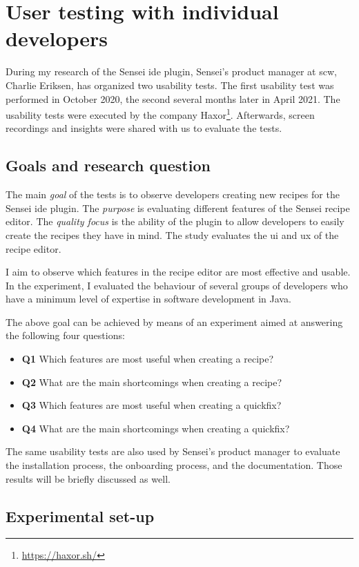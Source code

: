 \section{User testing with individual developers}
\label{sec:user-testing}
During my research of the Sensei \gls{ide} plugin, Sensei's product manager at \gls{scw}, Charlie Eriksen, has organized two usability tests.
The first usability test was performed in October 2020, the second several months later in April 2021.
The usability tests were executed by the company Haxor\footnote{\url{https://haxor.sh/}}.
Afterwards, screen recordings and insights were shared with us to evaluate the tests.

\subsection{Goals and research question}
The main \textit{goal} of the tests is to observe developers creating new recipes for the Sensei \gls{ide} plugin.
The \textit{purpose} is evaluating different features of the Sensei recipe editor.
The \textit{quality focus} is the ability of the plugin to allow developers to easily create the recipes they have in mind.
The study evaluates the \gls{ui} and \gls{ux} of the recipe editor.

I aim to observe which features in the recipe editor are most effective and usable.
In the experiment, I evaluated the behaviour of several groups of developers who have a minimum level of expertise in software development in Java.

The above goal can be achieved by means of an experiment aimed at answering the following four questions:
\begin{itemize}
    \item \textbf{Q1} Which features are most useful when creating a recipe?
    \item \textbf{Q2} What are the main shortcomings when creating a recipe?
    \item \textbf{Q3} Which features are most useful when creating a quickfix?
    \item \textbf{Q4} What are the main shortcomings when creating a quickfix?
\end{itemize}

The same usability tests are also used by Sensei's product manager to evaluate the installation process, the onboarding process, and the documentation.
Those results will be briefly discussed as well.

\subsection{Experimental set-up}
